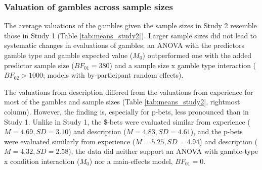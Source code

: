 \documentclass[a4paper, man, floatsintext]{apa6}
\title{}
\author{Jana B. Jarecki}
\date{15 Januar, 2020}
\begin{document}
\subsubsection{Valuation of gambles across sample sizes}

The average valuations of the gambles given the sample sizes in Study 2
resemble those in Study 1 (Table \ref{tab:means_study2}). Larger sample
sizes did not lead to systematic changes in evaluations of gambles; an
ANOVA with the predictors gamble type and gamble expected value
(\(M_0\)) outperformed one with the added predictor sample size
(\(BF_{01} = 380\)) and a sample size x gamble type interaction
(\(BF_{02} > 1000\); models with by-participant random effects).

The valuations
from description differed from the valuations from experience for most
of the gambles and sample sizes (Table \ref{tab:means_study2}, rightmost
column). However, the finding is, especially for p-bets, less pronounced
than in Study 1. Unlike in Study 1, the \$-bets were evaluated similar
from experience (\(M=4.69, SD=3.10\)) and description
(\(M=4.83, SD=4.61\)), and the p-bets were evaluated similarly from
experience (\(M=5.25, SD=4.94\)) and description (\(M=4.32, SD=2.58\)),
the data did neither support an ANOVA with gamble-type x condition
interaction (\(M_0\)) nor a main-effects model, \(BF_{01} = 0\).
\end{document}
